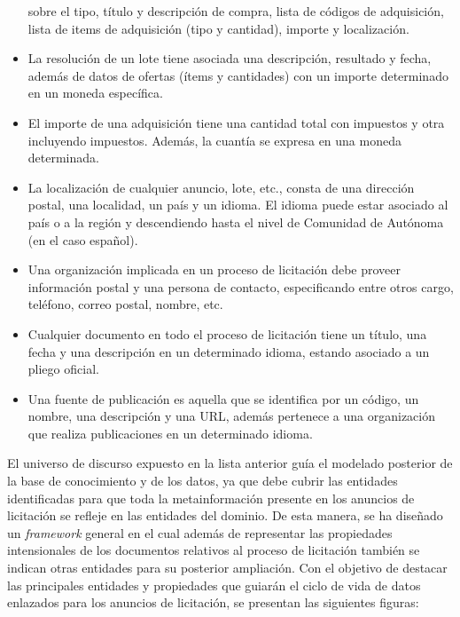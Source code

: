 \begin{itemize}
sobre el tipo, título y descripción de compra, lista de códigos de adquisición, lista de items de adquisición (tipo y cantidad),
importe y localización.
\item La resolución de un lote tiene asociada una descripción, resultado y fecha, además de datos de ofertas (ítems y cantidades) con 
un importe determinado en un moneda específica.
\item El importe de una adquisición tiene una cantidad total con impuestos y otra incluyendo impuestos. 
Además, la cuantía se expresa en una moneda determinada.
\item La localización de cualquier anuncio, lote, etc., consta de una dirección postal, una localidad, un país y un idioma. El idioma 
puede estar asociado al país o a la región y descendiendo hasta el nivel de Comunidad de Autónoma (en el caso español).
\item Una organización implicada en un proceso de licitación debe proveer información postal y una persona de contacto, especificando 
entre otros cargo, teléfono, correo postal, nombre, etc.
\item Cualquier documento en todo el proceso de licitación tiene un título, una fecha y una descripción en un determinado 
idioma, estando asociado a un pliego oficial.
\item Una fuente de publicación es aquella que se identifica por un código, un nombre, una descripción y una URL, además 
pertenece a una organización que realiza publicaciones en un determinado idioma.
\end{itemize}

El universo de discurso expuesto en la lista anterior guía el modelado posterior de la base de conocimiento 
y de los datos, ya que debe cubrir las entidades identificadas para que toda la metainformación presente 
en los anuncios de licitación se refleje en las entidades del dominio. De esta manera, se ha diseñado 
un \textit{framework} general en el cual además de representar las propiedades intensionales de los documentos 
relativos al proceso de licitación también se indican otras entidades para su posterior ampliación. Con 
el objetivo de destacar las principales entidades y propiedades que guiarán el ciclo de vida de 
datos enlazados para los anuncios de licitación, se presentan las siguientes figuras:


